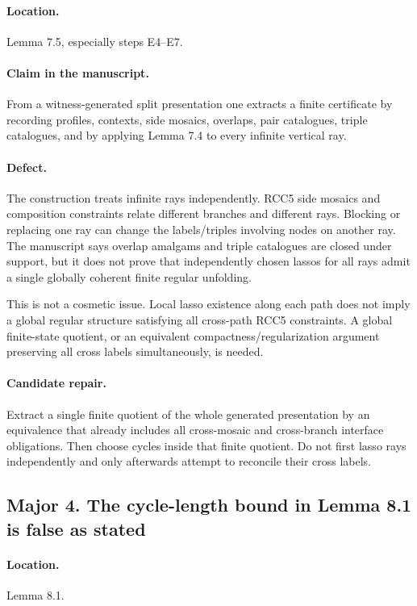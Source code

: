 \documentclass[11pt]{article}
\begin{document}
\paragraph{Location.} Lemma 7.5, especially steps E4--E7.

\paragraph{Claim in the manuscript.} From a witness-generated split presentation one extracts a finite certificate by recording profiles, contexts, side mosaics, overlaps, pair catalogues, triple catalogues, and by applying Lemma 7.4 to every infinite vertical ray.

\paragraph{Defect.} The construction treats infinite rays independently. RCC5 side mosaics and composition constraints relate different branches and different rays. Blocking or replacing one ray can change the labels/triples involving nodes on another ray. The manuscript says overlap amalgams and triple catalogues are closed under support, but it does not prove that independently chosen lassos for all rays admit a single globally coherent finite regular unfolding.

This is not a cosmetic issue. Local lasso existence along each path does not imply a global regular structure satisfying all cross-path RCC5 constraints. A global finite-state quotient, or an equivalent compactness/regularization argument preserving all cross labels simultaneously, is needed.

\paragraph{Candidate repair.} Extract a single finite quotient of the whole generated presentation by an equivalence that already includes all cross-mosaic and cross-branch interface obligations. Then choose cycles inside that finite quotient. Do not first lasso rays independently and only afterwards attempt to reconcile their cross labels.

\subsection*{Major 4. The cycle-length bound in Lemma 8.1 is false as stated}

\paragraph{Location.} Lemma 8.1.
\end{document}
